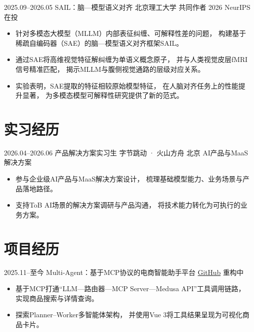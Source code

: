 \documentclass[10pt,a4paper,sans]{moderncv}
\begin{document}
\cventry
  {2025.09--2026.05}
  {SAIL：脑—模型语义对齐}
  {北京理工大学}
  {共同作者}
  {2026 NeurIPS在投}
  {
    \begin{itemize}
      \item 针对多模态大模型（MLLM）内部表征纠缠、可解释性差的问题，
      构建基于稀疏自编码器（SAE）的脑—模型语义对齐框架SAIL。
      \item 通过SAE将高维视觉特征解纠缠为单语义概念原子，
      并与人类视觉皮层fMRI信号精准匹配，
      揭示MLLM与腹侧视觉通路的层级对应关系。
      \item 实验表明，SAE提取的特征相较原始模型特征，
      在人脑对齐任务上的性能提升显著，
      为多模态模型可解释性研究提供了新的范式。
    \end{itemize}
  }


\section{实习经历}

\cventry
  {2026.04--2026.06}
  {产品解决方案实习生}
  {字节跳动 · 火山方舟}
  {北京}
  {AI产品与MaaS解决方案}
  {
    \begin{itemize}
      \item 参与企业级AI产品与MaaS解决方案设计，
      梳理基础模型能力、业务场景与产品落地路径。
      \item 支持ToB AI场景的解决方案调研与产品沟通，
      将技术能力转化为可执行的业务方案。
    \end{itemize}
  }


\clearpage
\section{项目经历}

\cventry
  {2025.11--至今}
  {Multi-Agent：基于MCP协议的电商智能助手平台}
  {\href{https://github.com/YifeiWang0618/Multi-Agent}{GitHub}}
  {}
  {重构中}
  {
    \begin{itemize}
      \item 基于MCP打通“LLM—路由器—MCP Server—Medusa API”工具调用链路，
      实现商品搜索与详情查询。
      \item 探索Planner--Worker多智能体架构，
      并使用Vue 3将工具结果呈现为可视化商品卡片。
    \end{itemize}
  }
\end{document}
